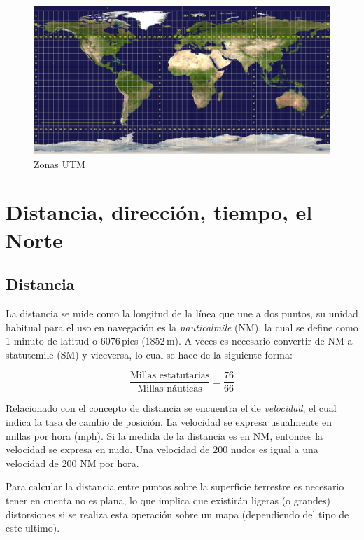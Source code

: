 \documentclass[a4paper,12pt,twoside]{article}
\begin{document}
\begin{figure}[!htb]
  \centering
  \includegraphics[width=\textwidth]{./Imagenes/Utm-zones.jpg}
  \caption{Zonas UTM}
  \label{fig:zonas.utm}
\end{figure}


\section{Distancia, direcci\'on, tiempo, el Norte}
\label{sec:distancia.direccion.tiempo}

\subsection{Distancia}
\label{sec:distancia}

La distancia se mide como la longitud de la l\'inea que une a dos puntos, su unidad habitual para el uso en navegaci\'on es la \emph{\gls{nauticalmile}} (NM), la cual se define como 1 minuto de latitud o $6076$\,pies ($1852$\,m). A veces es necesario convertir de NM a \gls{statutemile} (SM) y viceversa, lo cual se hace de la siguiente forma:

\[\displaystyle
	\frac{\text{Millas estatutarias}}{\text{Millas n\'auticas}} 
	= \frac{76}{66}
\]

Relacionado con el concepto de distancia se encuentra el de \emph{velocidad}, el cual indica la tasa de cambio de posici\'on. La velocidad se expresa usualmente en millas por hora (mph). Si la medida de la distancia es en NM, entonces la velocidad se expresa en \gls{nudo}. Una velocidad de 200 nudos es igual a una velocidad de 200 NM por hora.

Para calcular la distancia entre puntos sobre la superficie terrestre es necesario tener en cuenta no es plana, lo que implica que existir\'an ligeras (o grandes) distorsiones si se realiza esta operaci\'on sobre un mapa (dependiendo
del tipo de este ultimo).
  
\end{document}
